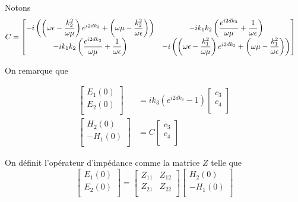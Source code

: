 Notons
\begin{align}
C &= 
\begin{bmatrix}
- i\left( \left(\omega\epsilon-\dfrac{k_2^2}{\omega\mu}\right)e^{i2dk_3} + \left(\omega\mu-\dfrac{k_2^2}{\omega\epsilon}\right) \right) & -i k_1k_2\left(\dfrac{e^{i2dk_3}}{\omega\mu} + \dfrac{1}{\omega\epsilon}\right)\\
- ik_1k_2\left(\dfrac{e^{i2dk_3}}{\omega\mu} + \dfrac{1}{\omega\epsilon}\right) &  - i\left( \left(\omega\epsilon-\dfrac{k_1^2}{\omega\mu}\right)e^{i2dk_3} + \left(\omega\mu-\dfrac{k_1^2}{\omega\epsilon}\right) \right)
\end{bmatrix}
\end{align}

On remarque que 

\begin{align}
    \begin{bmatrix}
        E_1(0)\\
        E_2(0)\\
    \end{bmatrix}
    & = ik_3\left(e^{i2dk_3} - 1\right)
    \begin{bmatrix}
        c_3 \\
        c_4 \\
    \end{bmatrix}\\
    \begin{bmatrix}
        H_2(0)\\
        -H_1(0)\\
    \end{bmatrix}
    & = C
    \begin{bmatrix}
        c_3 \\
        c_4 \\
    \end{bmatrix}
\end{align}

On définit l'opérateur d'impédance comme la matrice $Z$ telle que 
\begin{equation}
    \begin{bmatrix}
        E_1(0)\\
        E_2(0)\\
    \end{bmatrix}
    =
    \begin{bmatrix}
        Z_{11} & Z_{12} \\
        Z_{21} & Z_{22} \\
    \end{bmatrix}
    \begin{bmatrix}
        H_2(0)\\
        -H_1(0)\\
    \end{bmatrix}
\end{equation}

